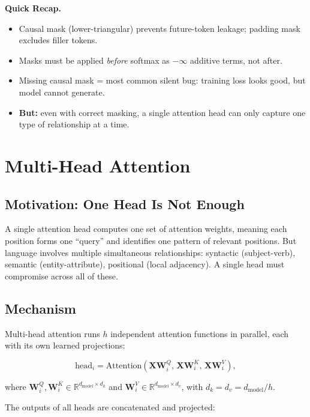 \begin{quickrecap}
\textbf{Quick Recap.}
\begin{itemize}[nosep,leftmargin=1.5em]
  \item Causal mask (lower-triangular) prevents future-token leakage; padding mask excludes filler tokens.
  \item Masks must be applied \emph{before} softmax as $-\infty$ additive terms, not after.
  \item Missing causal mask = most common silent bug: training loss looks good, but model cannot generate.
  \item \textbf{But:} even with correct masking, a single attention head can only capture one type of relationship at a time.
\end{itemize}
\end{quickrecap}


\section{Multi-Head Attention}

\subsection{Motivation: One Head Is Not Enough}

A single attention head computes one set of attention weights, meaning each position forms one ``query'' and identifies one pattern of relevant positions. But language involves multiple simultaneous relationships: syntactic (subject-verb), semantic (entity-attribute), positional (local adjacency). A single head must compromise across all of these.

\subsection{Mechanism}

Multi-head attention runs $h$ independent attention functions in parallel, each with its own learned projections:

\[
\text{head}_i = \text{Attention}(\mathbf{X}\mathbf{W}_i^Q, \, \mathbf{X}\mathbf{W}_i^K, \, \mathbf{X}\mathbf{W}_i^V),
\]

where $\mathbf{W}_i^Q, \mathbf{W}_i^K \in \mathbb{R}^{d_{\text{model}} \times d_k}$ and $\mathbf{W}_i^V \in \mathbb{R}^{d_{\text{model}} \times d_v}$, with $d_k = d_v = d_{\text{model}} / h$.

The outputs of all heads are concatenated and projected:

